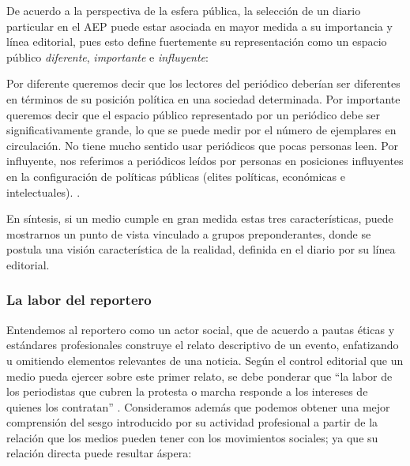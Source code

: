 \documentclass[letterpaper, 11pt]{book}
\theoremstyle{definition}
\theoremstyle{remark}
\begin{document}
De acuerdo a la perspectiva de la esfera pública, la selección de un diario particular en el AEP puede estar asociada en mayor medida a su importancia y línea editorial, pues esto define fuertemente su representación como un espacio público \emph{diferente}, \emph{importante} e \emph{influyente}:

\begin{center}
    \begin{minipage}{0.9\linewidth}
        {\setlength{\parindent}{12pt}\small
          Por diferente queremos decir que los lectores del periódico deberían ser diferentes en términos de su posición política en una sociedad determinada. 
          Por importante queremos decir que el espacio público representado por un periódico debe ser significativamente grande, lo que se puede medir por el número de ejemplares en circulación. 
          No tiene mucho sentido usar periódicos que pocas personas leen. 
          Por influyente, nos referimos a periódicos leídos por personas en posiciones influyentes en la configuración de políticas públicas (elites políticas, económicas e intelectuales). \normalsize \citep[117]{2003_Wada_Tesis}.
        }
    \end{minipage}
\end{center}

En síntesis, si un medio cumple en gran medida estas tres características, puede mostrarnos un punto de vista vinculado a grupos preponderantes, donde se postula una visión característica de la realidad, definida en el diario por su línea editorial.



\subsubsection{La labor del reportero}
\label{sec:Sesgo_reportero}

Entendemos al reportero como un actor social, que de acuerdo a pautas éticas y estándares profesionales construye el relato descriptivo de un evento, enfatizando u omitiendo elementos relevantes de una noticia. 
Según el control editorial que un medio pueda ejercer sobre este primer relato, se debe ponderar que ``la labor de los periodistas que cubren la protesta o marcha responde a los intereses de quienes los contratan'' \citep[278]{2015_Nicolasa_MassMedia}. 
Consideramos además que podemos obtener una mejor comprensión del sesgo introducido por su actividad profesional a partir de la relación que los medios pueden tener con los movimientos sociales; ya que su relación directa puede resultar áspera:
\end{document}
